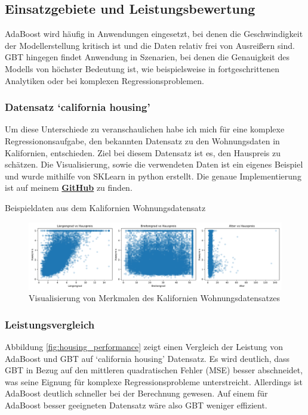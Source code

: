 \subsection{Einsatzgebiete und Leistungsbewertung}
AdaBoost wird häufig in Anwendungen eingesetzt, bei denen die Geschwindigkeit der Modellerstellung kritisch ist und die Daten relativ frei von Ausreißern sind. GBT hingegen findet Anwendung in Szenarien, bei denen die Genauigkeit des Modells von höchster Bedeutung ist, wie beispielsweise in fortgeschrittenen Analytiken oder bei komplexen Regressionsproblemen.

\subsubsection{Datensatz `california housing'}
Um diese Unterschiede zu veranschaulichen habe ich mich für eine komplexe Regressiononsaufgabe, den bekannten Datensatz zu den Wohnungsdaten in Kalifornien, entschieden. Ziel bei diesem Datensatz ist es, den Hauspreis zu schätzen. Die Visualisierung, sowie die verwendeten Daten ist ein eigenes Beispiel und wurde mithilfe von SKLearn in python erstellt. Die genaue Implementierung ist auf meinem \textbf{\href{https://github.com/CodeLtDave/Boosting-Algorithms-ML-Seminararbeit/blob/main/python-env/VergleichAdaBoostGBT.ipynb}{GitHub}} zu finden.

\begin{table}[ht]
    \centering
    \caption{Beispieldaten aus dem Kalifornien Wohnungsdatensatz}
    \label{tab:housing_data}
    \resizebox{\textwidth}{!}{
    
    }
\end{table}
    

\begin{figure}[ht]
    \centering
    \includegraphics[width=\textwidth]{Images/housing_features.png}
    \caption{Visualisierung von Merkmalen des Kalifornien Wohnungsdatensatzes}
    \label{fig:housing_features}
\end{figure}

\subsubsection{Leistungsvergleich}
Abbildung \ref{fig:housing_performance} zeigt einen Vergleich der Leistung von AdaBoost und GBT auf `california housing' Datensatz. Es wird deutlich, dass GBT in Bezug auf den mittleren quadratischen Fehler (MSE) besser abschneidet, was seine Eignung für komplexe Regressionsprobleme unterstreicht. Allerdings ist AdaBoost deutlich schneller bei der Berechnung gewesen. Auf einem für AdaBoost besser geeigneten Datensatz wäre also GBT weniger effizient.

